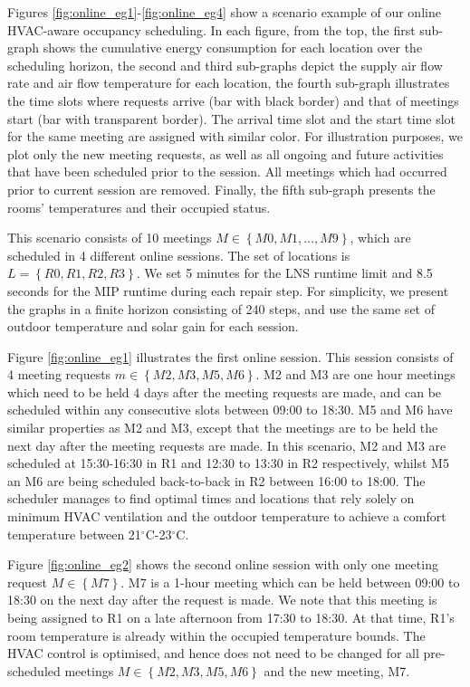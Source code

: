 Figures \ref{fig:online_eg1}-\ref{fig:online_eg4} show a scenario example of our online HVAC-aware occupancy scheduling. In each figure, from the top, the first sub-graph shows the cumulative energy consumption for each location over the scheduling horizon, the second and third sub-graphs depict the supply air flow rate and air flow temperature for each location, the fourth sub-graph illustrates the time slots where requests arrive (bar with black border) and that of meetings start (bar with transparent border). The arrival time slot and the start time slot for the same meeting are assigned with similar color. For illustration purposes, we plot only the new meeting requests, as well as all ongoing and future activities that have been scheduled prior to the session. All meetings which had occurred prior to current session are removed. Finally, the fifth sub-graph presents the rooms' temperatures and their occupied status.

This scenario consists of 10 meetings $M \in \left\{M0, M1,\ldots, M9\right\}$, which are scheduled in 4 different online sessions. The set of locations is $L = \left\{R0, R1, R2, R3\right\}$. We set 5 minutes for the LNS runtime limit and 8.5 seconds for the MIP runtime during each repair step. For simplicity, we present the graphs in a finite horizon consisting of 240 steps, and use the same set of outdoor temperature and solar gain for each session.

Figure \ref{fig:online_eg1} illustrates the first online session. This session consists of 4 meeting requests $m \in \left\{M2, M3, M5, M6\right\}$. M2 and M3 are one hour meetings which need to be held 4 days after the meeting requests are made, and can be scheduled within any consecutive slots between 09:00 to 18:30. M5 and M6 have similar properties as M2 and M3, except that the meetings are to be held the next day after the meeting requests are made. In this scenario, M2 and M3 are scheduled at 15:30-16:30 in R1 and 12:30 to 13:30 in R2 respectively, whilst M5 an M6 are being scheduled back-to-back in R2 between 16:00 to 18:00.
The scheduler manages to find optimal times and locations that rely solely on minimum HVAC ventilation and the outdoor temperature to achieve a comfort temperature between 21$^\circ$C-23$^\circ$C.

Figure \ref{fig:online_eg2} shows the second online session with only one meeting request $M \in \left\{M7\right\}$. M7 is a 1-hour meeting which can be held between 09:00 to 18:30 on the next day after the request is made. We note that this meeting is being assigned to R1 on a late afternoon from 17:30 to 18:30. At that time, R1's room temperature is already within the occupied temperature bounds. The HVAC control is optimised, and hence does not need to be changed for all pre-scheduled meetings  $M \in \left\{M2, M3, M5, M6\right\}$ and the new meeting, M7.

